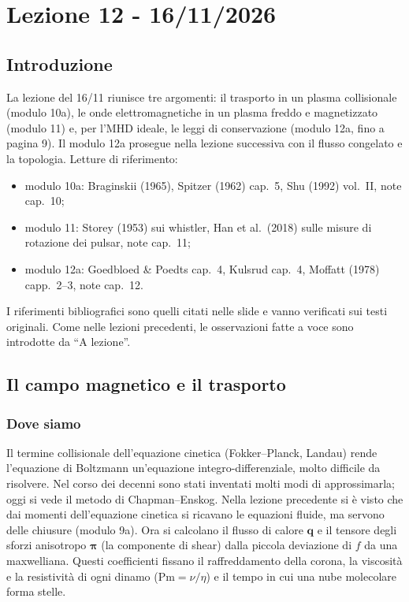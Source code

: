 \chapter{Lezione 12 - 16/11/2026}

\section{Introduzione}
La lezione del 16/11 riunisce tre argomenti: il trasporto in un plasma collisionale (modulo 10a), le onde elettromagnetiche in un plasma freddo e magnetizzato (modulo 11) e, per l'MHD ideale, le leggi di conservazione (modulo 12a, fino a pagina 9). Il modulo 12a prosegue nella lezione successiva con il flusso congelato e la topologia. Letture di riferimento:
\begin{itemize}
\item modulo 10a: Braginskii (1965), Spitzer (1962) cap.~5, Shu (1992) vol.~II, note cap.~10;
\item modulo 11: Storey (1953) sui whistler, Han et al.\ (2018) sulle misure di rotazione dei pulsar, note cap.~11;
\item modulo 12a: Goedbloed \& Poedts cap.~4, Kulsrud cap.~4, Moffatt (1978) capp.~2--3, note cap.~12.
\end{itemize}
I riferimenti bibliografici sono quelli citati nelle slide e vanno verificati sui testi originali. Come nelle lezioni precedenti, le osservazioni fatte a voce sono introdotte da ``A lezione''.

\section{Il campo magnetico e il trasporto}
\subsection{Dove siamo}
Il termine collisionale dell'equazione cinetica (Fokker--Planck, Landau) rende l'equazione di Boltzmann un'equazione integro-differenziale, molto difficile da risolvere. Nel corso dei decenni sono stati inventati molti modi di approssimarla; oggi si vede il metodo di Chapman--Enskog. Nella lezione precedente si è visto che dai momenti dell'equazione cinetica si ricavano le equazioni fluide, ma servono delle chiusure (modulo 9a). Ora si calcolano il flusso di calore $\mathbf{q}$ e il tensore degli sforzi anisotropo $\boldsymbol\pi$ (la componente di shear) dalla piccola deviazione di $f$ da una maxwelliana. Questi coefficienti fissano il raffreddamento della corona, la viscosità e la resistività di ogni dinamo ($\mathrm{Pm}=\nu/\eta$) e il tempo in cui una nube molecolare forma stelle.

